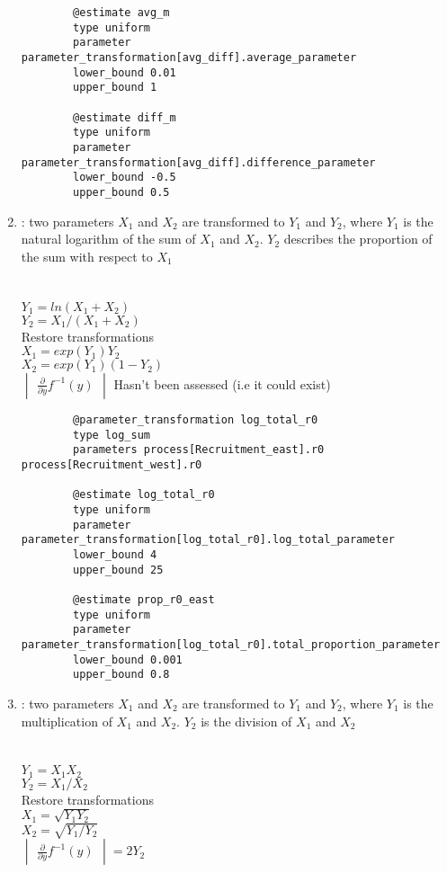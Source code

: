 \begin{enumerate}
{{\begin{verbatim}
		@estimate avg_m
		type uniform
		parameter parameter_transformation[avg_diff].average_parameter
		lower_bound 0.01
		upper_bound 1
		
		@estimate diff_m
		type uniform
		parameter parameter_transformation[avg_diff].difference_parameter
		lower_bound -0.5
		upper_bound 0.5		
\end{verbatim}}}
	
\item {} : two parameters $X_1$ and $X_2$ are transformed to $Y_1$ and $Y_2$, where $Y_1$ is the natural logarithm of the sum of $X_1$ and $X_2$. $Y_2$ describes the proportion of the sum with respect to $X_1$\\
\\
\\
$Y_1 = ln(X_1 + X_2)$\\
$Y_2 = X_1 / (X_1 + X_2)$\\
Restore transformations\\
$X_1 = exp(Y_1)Y_2$\\
$X_2 =exp(Y_1)(1 - Y_2)$\\
$\begin{vmatrix} \frac{\partial}{\partial y} f^{-1}(y) \end{vmatrix}$ Hasn't been assessed (i.e it could exist) \\
\label{sec:Transformation-LogSum}
{\small{\begin{verbatim}
		@parameter_transformation log_total_r0
		type log_sum
		parameters process[Recruitment_east].r0 process[Recruitment_west].r0
		
		@estimate log_total_r0
		type uniform
		parameter parameter_transformation[log_total_r0].log_total_parameter
		lower_bound 4
		upper_bound 25
		
		@estimate prop_r0_east
		type uniform
		parameter parameter_transformation[log_total_r0].total_proportion_parameter
		lower_bound 0.001
		upper_bound 0.8		
		\end{verbatim}}}
	
\item {} : two parameters $X_1$ and $X_2$ are transformed to $Y_1$ and $Y_2$, where $Y_1$ is the multiplication of $X_1$ and $X_2$. $Y_2$ is the division of $X_1$ and $X_2$\\
\\
\\
$Y_1 = X_1 X_2$\\
$Y_2 = X_1 / X_2$\\
Restore transformations\\
$X_1 = \sqrt{Y_1 Y_2}$\\
$X_2 = \sqrt{Y_1 / Y_2}$\\
$\begin{vmatrix} \frac{\partial}{\partial y} f^{-1}(y) \end{vmatrix} = 2Y_2$\\\\
\label{sec:Transformation-Orthogonal}


\end{enumerate}
